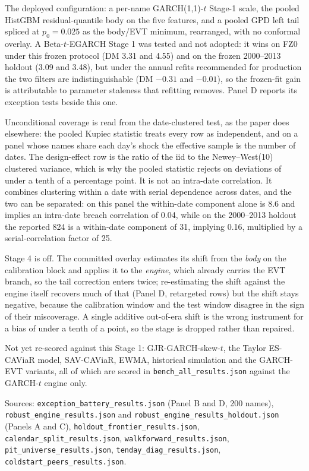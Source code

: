 \begin{tablenotes}\footnotesize
\item[$\dagger$] The deployed configuration: a per-name GARCH(1,1)-$t$ Stage-1 scale, the pooled HistGBM residual-quantile body on the five features, and a pooled GPD left tail spliced at $p_0=0.025$ as the body/EVT minimum, rearranged, with no conformal overlay. A Beta-$t$-EGARCH Stage 1 was tested and not adopted: it wins on FZ0 under this frozen protocol (DM 3.31 and 4.55) and on the frozen 2000--2013 holdout (3.09 and 3.48), but under the annual refits recommended for production the two filters are indistinguishable (DM $-0.31$ and $-0.01$), so the frozen-fit gain is attributable to parameter staleness that refitting removes. Panel D reports its exception tests beside this one. 
\item Unconditional coverage is read from the date-clustered test, as the paper does elsewhere: the pooled Kupiec statistic treats every row as independent, and on a panel whose names share each day's shock the effective sample is the number of dates. The design-effect row is the ratio of the iid to the Newey--West(10) clustered variance, which is why the pooled statistic rejects on deviations of under a tenth of a percentage point. It is not an intra-date correlation. It combines clustering within a date with serial dependence across dates, and the two can be separated: on this panel the within-date component alone is 8.6 and implies an intra-date breach correlation of 0.04, while on the 2000--2013 holdout the reported 824 is a within-date component of 31, implying 0.16, multiplied by a serial-correlation factor of 25. 
\item Stage 4 is off. The committed overlay estimates its shift from the \emph{body} on the calibration block and applies it to the \emph{engine}, which already carries the EVT branch, so the tail correction enters twice; re-estimating the shift against the engine itself recovers much of that (Panel D, retargeted rows) but the shift stays negative, because the calibration window and the test window disagree in the sign of their miscoverage. A single additive out-of-era shift is the wrong instrument for a bias of under a tenth of a point, so the stage is dropped rather than repaired. 
\item Not yet re-scored against this Stage 1: GJR-GARCH-skew-$t$, the Taylor ES-CAViaR model, SAV-CAViaR, EWMA, historical simulation and the GARCH-EVT variants, all of which are scored in \texttt{bench\_all\_results.json} against the GARCH-$t$ engine only. 
\item Sources: \texttt{exception\_battery\_results.json} (Panel B and D, 200 names), \texttt{robust\_engine\_results.json} and \texttt{robust\_engine\_results\_holdout.json} (Panels A and C), \texttt{holdout\_frontier\_results.json}, \texttt{calendar\_split\_results.json}, \texttt{walkforward\_results.json}, \texttt{pit\_universe\_results.json}, \texttt{tenday\_diag\_results.json}, \texttt{coldstart\_peers\_results.json}.
\end{tablenotes}
